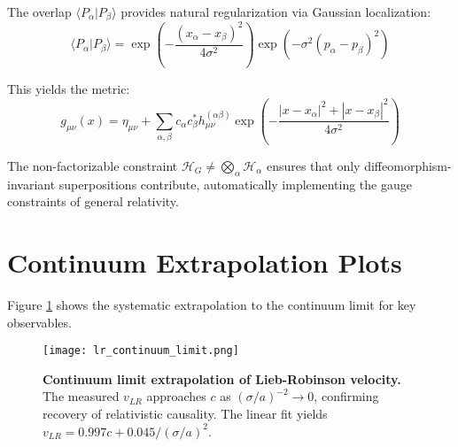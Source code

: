 \documentclass[11pt,a4paper]{article}
\begin{document}
The overlap $\langle P_\alpha | P_\beta \rangle$ provides natural regularization via Gaussian localization:
\begin{equation}
\langle P_\alpha | P_\beta \rangle = \exp\left(-\frac{(x_\alpha - x_\beta)^2}{4\sigma^2}\right) \exp\left(-\sigma^2(p_\alpha - p_\beta)^2\right)
\end{equation}

This yields the metric:
\begin{equation}
g_{\mu\nu}(x) = \eta_{\mu\nu} + \sum_{\alpha,\beta} c_\alpha c_\beta^* h_{\mu\nu}^{(\alpha\beta)} \exp\left(-\frac{|x-x_\alpha|^2 + |x-x_\beta|^2}{4\sigma^2}\right)
\end{equation}

The non-factorizable constraint $\mathcal{H}_G \neq \bigotimes_\alpha \mathcal{H}_\alpha$ ensures that only diffeomorphism-invariant superpositions contribute, automatically implementing the gauge constraints of general relativity.

\section{Continuum Extrapolation Plots}
\label{app:continuum}

Figure \ref{fig:continuum} shows the systematic extrapolation to the continuum limit for key observables.

\begin{figure}[H]
\centering
\texttt{[image: lr\_continuum\_limit.png]}
\caption{\textbf{Continuum limit extrapolation of Lieb-Robinson velocity.} The measured $v_{LR}$ approaches $c$ as $(\sigma/a)^{-2} \to 0$, confirming recovery of relativistic causality. The linear fit yields $v_{LR} = 0.997c + 0.045/(\sigma/a)^2$.}
\label{fig:continuum}
\end{figure}
\end{document}
